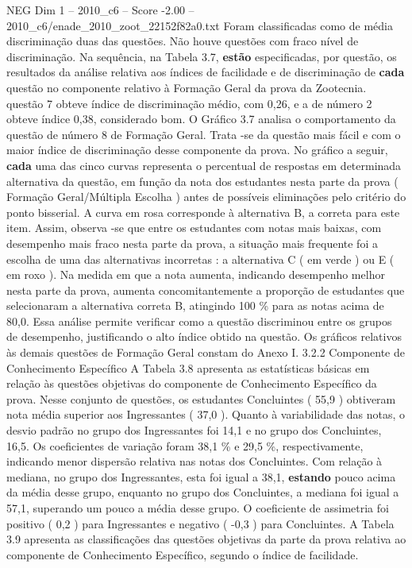\begin{textsample}{NEG Dim 1 – 2010\_c6 – Score -2.00 – 2010\_c6/enade\_2010\_zoot\_22152f82a0.txt}
Foram classificadas como de média discriminação duas das questões.
Não houve questões com fraco nível de discriminação.
Na sequência, na Tabela 3.7, \textbf{estão} especificadas, por questão, os resultados da análise relativa aos índices de facilidade e de discriminação de \textbf{cada} questão no componente relativo à Formação Geral da prova da Zootecnia. questão 7 obteve índice de discriminação médio, com 0,26, e a de número 2 obteve índice 0,38, considerado bom.
O Gráfico 3.7 analisa o comportamento da questão de número 8 de Formação Geral.
Trata -se da questão mais fácil e com o maior índice de discriminação desse componente da prova.
No gráfico a seguir, \textbf{cada} uma das cinco curvas representa o percentual de respostas em determinada alternativa da questão, em função da nota dos estudantes nesta parte da prova ( Formação Geral/Múltipla Escolha ) antes de possíveis eliminações pelo critério do ponto bisserial.
A curva em rosa corresponde à alternativa B, a correta para este item.
Assim, observa -se que entre os estudantes com notas mais baixas, com desempenho mais fraco nesta parte da prova, a situação mais frequente foi a escolha de uma das alternativas incorretas : a alternativa C ( em verde ) ou E ( em roxo ).
Na medida em que a nota aumenta, indicando desempenho melhor nesta parte da prova, aumenta concomitantemente a proporção de estudantes que selecionaram a alternativa correta B, atingindo 100 \% para as notas acima de 80,0.
Essa análise permite verificar como a questão discriminou entre os grupos de desempenho, justificando o alto índice obtido na questão.
Os gráficos relativos às demais questões de Formação Geral constam do Anexo I. 3.2.2 Componente de Conhecimento Específico A Tabela 3.8 apresenta as estatísticas básicas em relação às questões objetivas do componente de Conhecimento Específico da prova.
Nesse conjunto de questões, os estudantes Concluintes ( 55,9 ) obtiveram nota média superior aos Ingressantes ( 37,0 ).
Quanto à variabilidade das notas, o desvio padrão no grupo dos Ingressantes foi 14,1 e no grupo dos Concluintes, 16,5.
Os coeficientes de variação foram 38,1 \% e 29,5 \%, respectivamente, indicando menor dispersão relativa nas notas dos Concluintes.
Com relação à mediana, no grupo dos Ingressantes, esta foi igual a 38,1, \textbf{estando} pouco acima da média desse grupo, enquanto no grupo dos Concluintes, a mediana foi igual a 57,1, superando um pouco a média desse grupo.
O coeficiente de assimetria foi positivo ( 0,2 ) para Ingressantes e negativo ( -0,3 ) para Concluintes.
A Tabela 3.9 apresenta as classificações das questões objetivas da parte da prova relativa ao componente de Conhecimento Específico, segundo o índice de facilidade.

\end{textsample}
